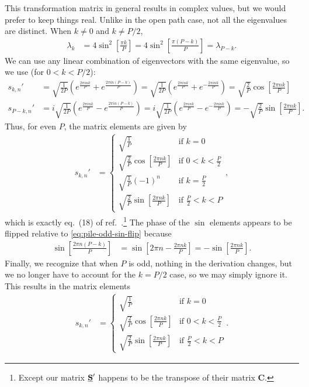 This transformation matrix in general results in complex values, but we would prefer to keep things real.
Unlike in the open path case, not all the eigenvalues are distinct.
When $k \ne 0$ and $k \ne P/2$,
\begin{align}
	\lambda_k
	&= 4 \sin^2{\left[ \frac{\pi k}{P} \right]}
	= 4 \sin^2{\left[ \frac{\pi (P - k)}{P} \right]}
	= \lambda_{P-k}.
\end{align}
We can use any linear combination of eigenvectors with the same eigenvalue, so we use (for $0 < k < P/2$):
\begin{subequations}
\begin{align}
	s_{k,n}'
	&= \sqrt{\frac{1}{2 P}} \left( e^{\frac{2 \pi i n k}{P}} + e^{\frac{2 \pi i n (P - k)}{P}} \right)
	= \sqrt{\frac{1}{2 P}} \left( e^{\frac{2 \pi i n k}{P}} + e^{-\frac{2 \pi i n k}{P}} \right)
	= \sqrt{\frac{2}{P}} \cos{\left[ \frac{2 \pi n k}{P} \right]} \\
	s_{P-k,n}'
	&= i \sqrt{\frac{1}{2 P}} \left( e^{\frac{2 \pi i n k}{P}} - e^{\frac{2 \pi i n (P - k)}{P}} \right)
	= i \sqrt{\frac{1}{2 P}} \left( e^{\frac{2 \pi i n k}{P}} - e^{-\frac{2 \pi i n k}{P}} \right)
	= -\sqrt{\frac{2}{P}} \sin{\left[ \frac{2 \pi n k}{P} \right]}.
			\label{eq:pile-odd-sin-flip}
\end{align}
\end{subequations}
Thus, for even $P$, the matrix elements are given by
\begin{align}
	s_{k,n}'
	&= \begin{cases}
			\sqrt{\frac{1}{P}} & \text{if } k = 0 \\
			\sqrt{\frac{2}{P}} \cos{\left[ \frac{2 \pi n k}{P} \right]} & \text{if } 0 < k < \frac{P}{2} \\
			\sqrt{\frac{1}{P}} (-1)^n & \text{if } k = \frac{P}{2} \\
			\sqrt{\frac{2}{P}} \sin{\left[ \frac{2 \pi n k}{P} \right]} & \text{if } \frac{P}{2} < k < P
		\end{cases},
\end{align}
which is exactly eq.~(18) of ref.~\cite{ceriotti2010efficient}.\footnote{
	Except our matrix $\underline{\bm{\mathbf{S}}}'$ happens to be the transpose of their matrix $\mathbf{C}$.
}
The phase of the $\sin$ elements appears to be flipped relative to \cref{eq:pile-odd-sin-flip} because
\begin{align}
	\sin{\left[ \frac{2 \pi n (P - k)}{P} \right]}
	&= \sin{\left[ 2 \pi n - \frac{2 \pi n k}{P} \right]}
	= -\sin{\left[ \frac{2 \pi n k}{P} \right]}.
\end{align}
Finally, we recognize that when $P$ is odd, nothing in the derivation changes, but we no longer have to account for the $k = P/2$ case, so we may simply ignore it.
This results in the matrix elements
\begin{align}
	s_{k,n}'
	&= \begin{cases}
			\sqrt{\frac{1}{P}} & \text{if } k = 0 \\
			\sqrt{\frac{2}{P}} \cos{\left[ \frac{2 \pi n k}{P} \right]} & \text{if } 0 < k < \frac{P}{2} \\
			\sqrt{\frac{2}{P}} \sin{\left[ \frac{2 \pi n k}{P} \right]} & \text{if } \frac{P}{2} < k < P
		\end{cases}.
\end{align}
